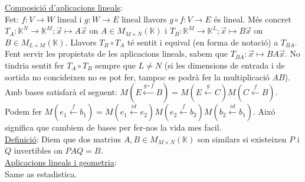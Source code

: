 \underline{Composició d'aplicacions lineals}:\\
Fet: $f: V \rightarrow W$ lineal i $g: W \longrightarrow E$ lineal llavors $g \circ f: V \longrightarrow E$ és lineal. Més concret $T_A: \mathbb{K}^N \longrightarrow \mathbb{K}^M; \vec{x} \longmapsto A\vec{x}$ on $A \in M_{M\times N}(\mathbb{K})$ i $T_B: \mathbb{K}^M \longrightarrow \mathbb{K}^L; \vec{x} \longmapsto B\vec{x}$ on $B \in M_{L\times M}(\mathbb{K})$. Llavors $T_B \circ T_A$ té sentit i equival (en forma de notació) a $T_{BA}$. Fent servir les propietats de les aplicacions lineals, sabem que $T_{BA}: \vec{x} \longmapsto BA\vec{x}$. No tindria sentit fer $T_A \circ T_B$ sempre que $L \neq N$ (si les dimensions de entrada i de sortida no concideixen no es pot fer, tampoc es podrà fer la multiplicació $AB$).\\
Amb bases satisfarà el seguent: $M(E \xleftarrow{g \circ f} B) = M(E \xleftarrow{g} C)M(C \xleftarrow{f} B)$.\\
Podem fer $M(e_1 \xleftarrow{f} b_1) = M(e_1 \xleftarrow{id} e_2)M(e_2 \xleftarrow{f} b_2)M(b_2 \xleftarrow{id} b_1)$. Aixó significa que cambiem de bases per fer-nos la vida mes facil.\\
\underline{Definició}: Diem que dos matrius $A, B \in M_{M\times N}(\mathbb{K})$ son similars si existeixen $P$ i $Q$ invertibles on $PAQ = B$.\\
\underline{Aplicacions lineals i geometria}:\\
Same as estadistica.
